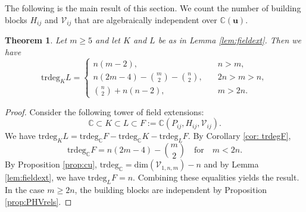 \documentclass[12pt,a4paper]{extarticle}
\newtheorem{theorem}{Theorem}[section]
\theoremstyle{definition}
\begin{document}
The following is the main result of this section. We count the number of building blocks $H_{ij}$ and $\mathcal{V}_{ij}$ that are algebraically independent over $\mathbb{C}(\mathbf{u})$. 
\begin{theorem}
Let $m\geq 5$ and let $K$ and $L$ be as in Lemma \ref{lem:fieldext}.
Then we have
\begin{equation}
\mathrm{trdeg}_K L=
\begin{cases}
   n(m-2), \quad &n>m,\\
   n(2m-4)-\binom{m}{2} - \binom{n}{2}, \quad &2n>m>n,\\
   \binom{n}{2}+n(n-2), \quad &m>2n.
\end{cases}
\end{equation}
\end{theorem}
\begin{proof}
    Consider the following tower of field extensions:
    \begin{equation}
        \mathbb{C}\subset K \subset L \subset F:=\mathbb{C}(P_{ij},H_{ij},\mathcal{V}_{ij}).
    \end{equation}
We have $\mathrm{trdeg}_K L= \mathrm{trdeg}_\mathbb{C}F - \mathrm{trdeg}_\mathbb{C} K-\mathrm{trdeg}_L F$. 
By Corollary \ref{cor: trdegF},
\begin{equation}
\mathrm{trdeg}_\mathbb{C}F =n(2m-4)-\binom{m}{2} \quad \mathrm{for} \quad m<2n.
\end{equation}
By Proposition \ref{prop:cu}, $\mathrm{trdeg}_\mathbb{C} = \mathrm{dim}(\mathcal{V}_{1,n,m})-n$ and by Lemma \ref{lem:fieldext}, we have $\mathrm{trdeg}_LF=n$.
Combining these equalities yields the result. 
In the case $m\geq 2n$, the building blocks are independent by Proposition \ref{prop:PHVrels}.
\end{proof}
\end{document}

